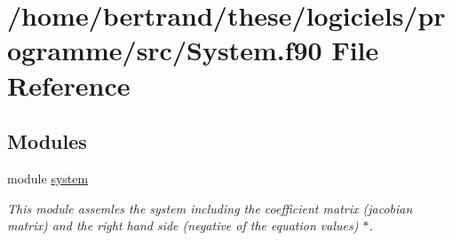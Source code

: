 \hypertarget{_system_8f90}{}\section{/home/bertrand/these/logiciels/programme/src/\+System.f90 File Reference}
\label{_system_8f90}
\subsection*{Modules}
\begin{DoxyCompactItemize}
\item 
module \hyperlink{namespacesystem}{system}
\begin{DoxyCompactList}\small\item\em This module assemles the system including the coefficient matrix (jacobian matrix) and the right hand side (negative of the equation values) $\ast$. \end{DoxyCompactList}\end{DoxyCompactItemize}
